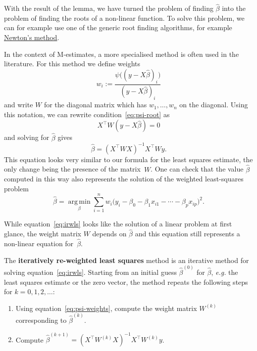 \documentclass[
  a4paper,
]{article}
\theoremstyle{definition}
\theoremstyle{definition}
\theoremstyle{definition}
\theoremstyle{definition}
\theoremstyle{remark}
\begin{document}
With the result of the lemma, we have turned the problem of finding
\(\hat\beta\) into the problem of finding the roots of a non-linear
function. To solve this problem, we can for example use one
of the generic root finding algorithms, for example
\href{https://en.wikipedia.org/wiki/Newton\%27s_method}{Newton's method}.

In the context of M-estimates, a more specialised method is often used in the
literature. For this method we define weights
\begin{equation}
  w_i
  := \frac{\psi\bigl( (y - X\hat\beta)_i \bigr)}{(y - X\hat\beta)_i}
                                \label{eq:psi-weights}
\end{equation}
and write \(W\) for the diagonal matrix which has \(w_1, \ldots, w_n\)
on the diagonal. Using this notation, we can rewrite
condition~\eqref{eq:psi-root} as
\begin{equation*}
  X^\top W (y - X\hat\beta)
  = 0
\end{equation*}
and solving for \(\hat\beta\) gives
\begin{equation}
  \hat\beta
  = (X^\top W X)^{-1} X^\top W y. \label{eq:irwls}
\end{equation}
This equation looks very similar to our formula for the least squares
estimate, the only change being the presence of the matrix~\(W\).
One can check that the value \(\hat\beta\) computed in this way
also represents the solution of the weighted least-squares problem
\begin{equation*}
  \hat\beta
  = \mathop{\mathrm{arg\,min}}\limits_\beta \sum_{i=1}^n w_i \bigl( y_i - \beta_0 - \beta_1 x_{i1} - \cdots - \beta_p x_{ip} \bigr)^2.
\end{equation*}

While equation~\eqref{eq:irwls} looks like the solution of a linear problem at
first glance, the weight matrix \(W\) depends on \(\hat\beta\) and this equation
still represents a non-linear equation for~\(\hat\beta\).

The \textbf{iteratively re-weighted least squares} method is an iterative method
for solving equation~\eqref{eq:irwls}. Starting from an initial guess \(\hat\beta^{(0)}\)
for \(\hat\beta\), \emph{e.g.} the least squares estimate or the zero vector,
the method repeats the following steps for \(k = 0, 1, 2, \ldots\):

\begin{enumerate}
\def\labelenumi{\arabic{enumi}.}
\item
  Using equation~\eqref{eq:psi-weights}, compute the weight
  matrix \(W^{(k)}\) corresponding to \(\hat\beta^{(k)}\).
\item
  Compute \(\displaystyle\hat\beta^{(k+1)} = (X^\top W^{(k)} X)^{-1} X^\top W^{(k)} y\).
\end{enumerate}
\end{document}
